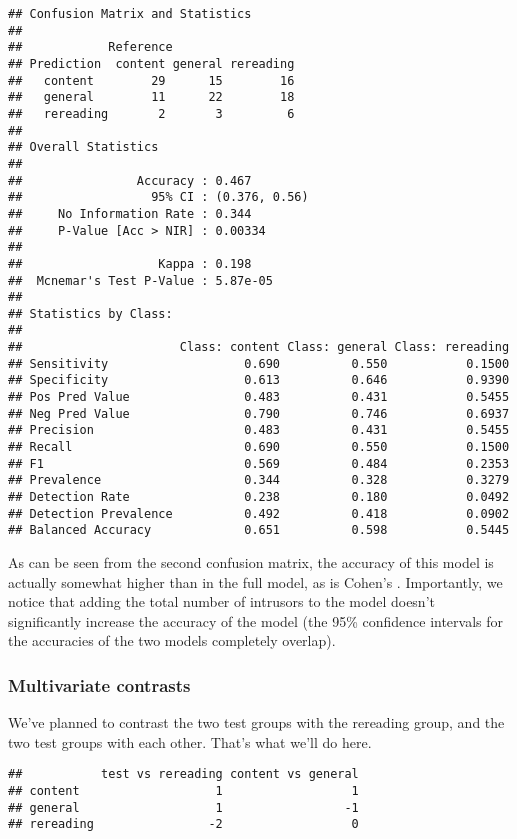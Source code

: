 \documentclass[12pt,]{article}
\begin{document}
\begin{verbatim}
## Confusion Matrix and Statistics
## 
##            Reference
## Prediction  content general rereading
##   content        29      15        16
##   general        11      22        18
##   rereading       2       3         6
## 
## Overall Statistics
##                                        
##                Accuracy : 0.467        
##                  95% CI : (0.376, 0.56)
##     No Information Rate : 0.344        
##     P-Value [Acc > NIR] : 0.00334      
##                                        
##                   Kappa : 0.198        
##  Mcnemar's Test P-Value : 5.87e-05     
## 
## Statistics by Class:
## 
##                      Class: content Class: general Class: rereading
## Sensitivity                   0.690          0.550           0.1500
## Specificity                   0.613          0.646           0.9390
## Pos Pred Value                0.483          0.431           0.5455
## Neg Pred Value                0.790          0.746           0.6937
## Precision                     0.483          0.431           0.5455
## Recall                        0.690          0.550           0.1500
## F1                            0.569          0.484           0.2353
## Prevalence                    0.344          0.328           0.3279
## Detection Rate                0.238          0.180           0.0492
## Detection Prevalence          0.492          0.418           0.0902
## Balanced Accuracy             0.651          0.598           0.5445
\end{verbatim}

As can be seen from the second confusion matrix, the accuracy of this
model is actually somewhat higher than in the full model, as is Cohen's
\textkappa. Importantly, we notice that adding the total number of
intrusors to the model doesn't significantly increase the accuracy of
the model (the 95\% confidence intervals for the accuracies of the two
models completely overlap).

\hypertarget{multivariate-contrasts}{%
\subsubsection{Multivariate contrasts}\label{multivariate-contrasts}}

We've planned to contrast the two test groups with the rereading group,
and the two test groups with each other. That's what we'll do here.

\begin{verbatim}
##           test vs rereading content vs general
## content                   1                  1
## general                   1                 -1
## rereading                -2                  0
\end{verbatim}
\end{document}
